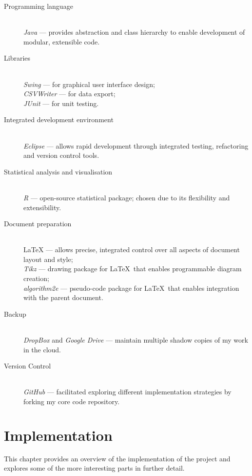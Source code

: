 \documentclass[12pt,notitlepage]{report}
\begin{document}
\begin{description}
  \item[Programming language] \hfill \\
  {\em Java} --- provides abstraction and class hierarchy to enable development of modular, extensible code.
  \item[Libraries] \hfill \\
  {\em Swing} --- for graphical user interface design;\\ 
  {\em CSVWriter} --- for data export;\\
  {\em JUnit} --- for unit testing.
  \item[Integrated development environment] \hfill \\
  {\em Eclipse} --- allows rapid development through integrated testing, refactoring and version control tools.
  \item[Statistical analysis and visualisation] \hfill \\
  {\em R} --- open-source statistical package; chosen due to its flexibility and extensibility.
  \item[Document preparation] \hfill \\
  {\LaTeX} --- allows precise, integrated control over all aspects of document layout and style;\\
  {\em Tikz} --- drawing package for \LaTeX\ that enables programmable diagram creation;\\
  {\em algorithm2e} --- pseudo-code package for \LaTeX\ that enables integration with the parent document.
  \item[Backup] \hfill \\
  {\em DropBox} and {\em Google Drive} --- maintain multiple shadow copies of my work in the cloud.
  \item[Version Control]\hfill \\
  {\em GitHub} --- facilitated exploring different implementation strategies by forking my core code repository.
  
\end{description}

\chapter{Implementation}

This chapter provides an overview of the implementation of the project and explores some of the more interesting parts in further detail.\\
\end{document}

